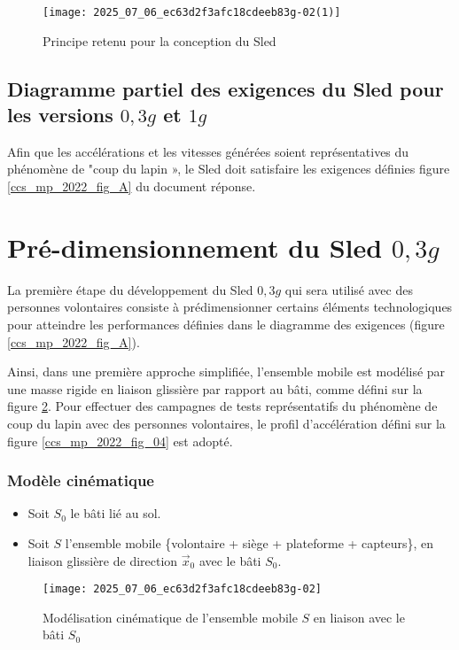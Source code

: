 \begin{figure}[!h]
\centering
\texttt{[image: 2025\_07\_06\_ec63d2f3afc18cdeeb83g-02(1)]}

\caption{Principe retenu pour la conception du Sled \label{ccs_mp_2022_fig_02}}
\end{figure}
\subsection{Diagramme partiel des exigences du Sled pour les versions $0,3 g$ et $1 g$ \label{ccs_mp_2022_sec_1B}}
Afin que les accélérations et les vitesses générées soient représentatives du phénomène de "coup du lapin », le Sled doit satisfaire les exigences définies figure \ref{ccs_mp_2022_fig_A} du document réponse.
\section{Pré-dimensionnement du Sled $0,3 g$ \label{ccs_mp_2022_sec_2}}
La première étape du développement du Sled $0,3 g$ qui sera utilisé avec des personnes volontaires consiste à prédimensionner certains éléments technologiques pour atteindre les performances définies dans le diagramme des exigences (figure \ref{ccs_mp_2022_fig_A}).

Ainsi, dans une première approche simplifiée, l'ensemble mobile est modélisé par une masse rigide en liaison glissière par rapport au bâti, comme défini sur la figure \ref{ccs_mp_2022_fig_03}. Pour effectuer des campagnes de tests représentatifs du phénomène de coup du lapin avec des personnes volontaires, le profil d'accélération défini sur la figure \ref{ccs_mp_2022_fig_04} est adopté.

\subsubsection*{Modèle cinématique}
\begin{itemize}
  \item Soit $S_{0}$ le bâti lié au sol.
  \item Soit $S$ l'ensemble mobile \{volontaire + siège + plateforme + capteurs\}, en liaison glissière de direction $\vec{x}_{0}$ avec le bâti $S_{0}$.
\end{itemize}

\begin{figure}[!h]
\centering
\texttt{[image: 2025\_07\_06\_ec63d2f3afc18cdeeb83g-02]}
\caption{\label{ccs_mp_2022_fig_03} Modélisation cinématique de l'ensemble mobile $S$ en liaison avec le bâti $S_{0}$}
\end{figure}



